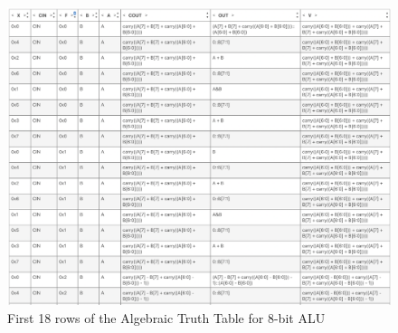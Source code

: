 \begin{figure}
    \centering
    \includegraphics[width=\textwidth]{06.TestRes/alutable.png}
    \caption{First 18 rows of the Algebraic Truth Table for 8-bit ALU}
    \label{fig:alutable}
\end{figure}